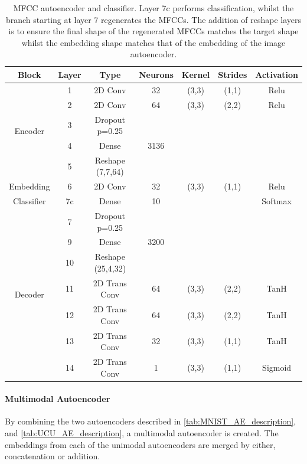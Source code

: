 	\begin{table}[t]
		\centering
		\begin{tabular}{|c|c|c|c|c|c|c|}
			\hline
			\textbf{Block} & \textbf{Layer} & \textbf{Type} & \textbf{Neurons} & \textbf{Kernel} & \textbf{Strides} & \textbf{Activation}  \\ \hline
			\multirow{5}{*}{Encoder} & 1	&	2D Conv & 32 & (3,3) & (1,1)  & Relu\\ \cline{2-7}
			& 2	&	2D Conv & 64 & (3,3) & (2,2)  & Relu\\ \cline{2-7}
			& 3 	&	Dropout p=0.25 &	 & 	     &        & \\ \cline{2-7}
			& 4	&	Dense          & 3136 & 	 &        & \\ \cline{2-7}
			& 5   &	Reshape (7,7,64) &    &     &        & \\ \hline
			Embedding & 6	&	2D Conv & 32 & (3,3) & (1,1)  & Relu  \\ \hline
			Classifier & 7c	&	Dense          & 10 &       &        & Softmax \\ \hline
			\multirow{7}{*}{Decoder} & 7 	&	Dropout p=0.25 &	 & 	     &        & \\ \cline{2-7}
			& 9	&	Dense			& 3200 &     &        & \\ \cline{2-7}
			& 10	&	Reshape (25,4,32) &    &    &        & \\ \cline{2-7}
			& 11	&	2D Trans Conv & 64 & (3,3) & (2,2)  & TanH \\ \cline{2-7}
			& 12	&	2D Trans Conv & 64 & (3,3) & (2,2)  & TanH \\ \cline{2-7}
			& 13	&	2D Trans Conv & 32 & (3,3) & (1,1)  & TanH \\ \cline{2-7}
			& 14	&	2D Trans Conv & 1 & (3,3) & (1,1) & Sigmoid \\ \hline
		\end{tabular}
		\caption{MFCC autoencoder and classifier. Layer 7c performs classification, whilst the branch starting at layer 7 regenerates the MFCCs. The addition of reshape layers is to ensure the final shape of the regenerated MFCCs matches the target shape whilst the embedding shape matches that of the embedding of the image autoencoder.}
		\label{tab:UCU_AE_description}
	\end{table}

\paragraph{Multimodal Autoencoder}
By combining the two autoencoders described in \autoref{tab:MNIST_AE_description}, and \autoref{tab:UCU_AE_description}, a multimodal autoencoder is created. The embeddings from each of the unimodal autoencoders are merged by either, concatenation or addition.
 
